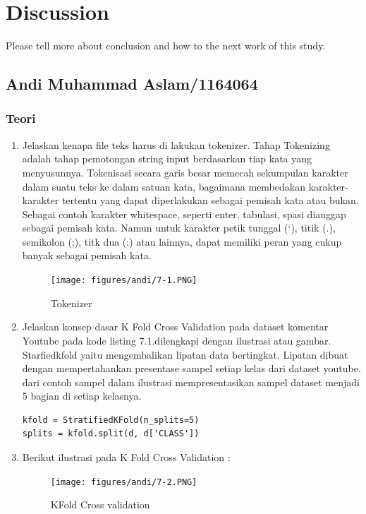 \chapter{Discussion}
Please tell more about conclusion and how to the next work of this study.

\section{Andi Muhammad Aslam/1164064}
\subsection{Teori}
\begin{enumerate}
\item Jelaskan kenapa file teks harus di lakukan tokenizer.
\subitem Tahap Tokenizing adalah tahap pemotongan string input berdasarkan tiap kata yang menyusunnya. Tokenisasi secara garis besar memecah sekumpulan karakter dalam suatu teks ke dalam satuan kata, bagaimana membedakan karakter-karakter tertentu yang dapat diperlakukan sebagai pemisah kata atau bukan. Sebagai contoh karakter whitespace, seperti enter, tabulasi, spasi dianggap sebagai pemisah kata. Namun untuk karakter petik tunggal (‘), titik (.), semikolon (;), titk dua (:) atau lainnya, dapat memiliki peran yang cukup banyak sebagai pemisah kata.
\begin{figure}[!htbp]
	\centerline{\texttt{[image: figures/andi/7-1.PNG]}}
	\caption{Tokenizer}
	\label{Teori}
\end{figure}

\item Jelaskan konsep dasar K Fold Cross Validation pada dataset komentar Youtube pada kode listing 7.1.dilengkapi dengan ilustrasi atau gambar.
\subitem Starfiedkfold yaitu mengembalikan lipatan data bertingkat. Lipatan dibuat dengan mempertahankan presentase sampel setiap kelas dari dataset youtube. dari contoh sampel dalam ilustrasi mempresentasikan sampel dataset menjadi 5 bagian di setiap kelasnya.

\begin{lstlisting}[caption=K Fold Cross Validation,label={lst:7.0}]
kfold = StratifiedKFold(n_splits=5)
splits = kfold.split(d, d['CLASS'])
\end{lstlisting}

\item Berikut ilustrasi pada K Fold Cross Validation :
\begin{figure}[ht]
\centering
\texttt{[image: figures/andi/7-2.PNG]}
\caption{ KFold Cross validation}
\label{Teori}
\end{figure}


\end{enumerate}
